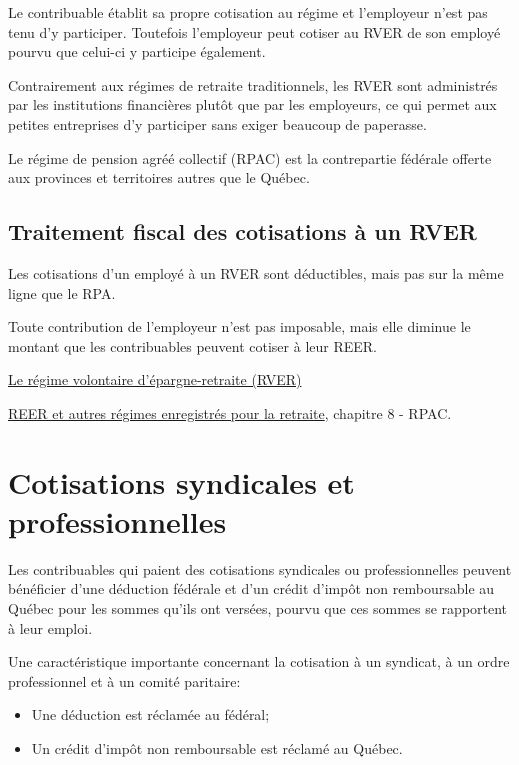 Le contribuable établit sa propre cotisation au régime et l'employeur n'est pas tenu d'y participer. Toutefois l'employeur peut cotiser au RVER de son employé pourvu que celui-ci y participe également.

Contrairement aux régimes de retraite traditionnels, les RVER sont administrés par les institutions financières plutôt que par les employeurs, ce qui permet aux petites entreprises d'y participer sans exiger beaucoup de paperasse.

Le régime de pension agréé collectif (RPAC) est la contrepartie fédérale offerte aux provinces et territoires autres que le Québec.


\subsection{Traitement fiscal des cotisations à un RVER}
Les cotisations d'un employé à un RVER sont déductibles, mais pas sur la même ligne que le RPA. 

Toute contribution de l'employeur n'est pas imposable, mais elle diminue le montant que les contribuables peuvent cotiser à leur REER.

\qct\href{https://www.rrq.gouv.qc.ca/fr/retraite/rver/Pages/rver.aspx}{Le régime volontaire d'épargne-retraite (RVER)}

\cat\href{https://www.canada.ca/fr/agence-revenu/services/formulaires-publications/publications/t4040/reer-autres-regimes-enregistres-retraite.html}{REER et autres régimes enregistrés pour la retraite}, chapitre 8 - RPAC.



\section{Cotisations syndicales et professionnelles}
\begin{intro}
	Les contribuables qui paient des cotisations syndicales ou professionnelles peuvent bénéficier d'une déduction fédérale et d'un crédit d'impôt non remboursable au Québec pour les sommes qu'ils ont versées, pourvu que ces sommes se rapportent à leur emploi.
\end{intro}
\begin{note}
	Une caractéristique importante concernant la cotisation à un syndicat, à un ordre professionnel et à un comité paritaire:
	\begin{itemize}
		\item Une déduction est réclamée au fédéral;
		\item Un crédit d'impôt non remboursable est réclamé au Québec.
	\end{itemize}
\end{note}



